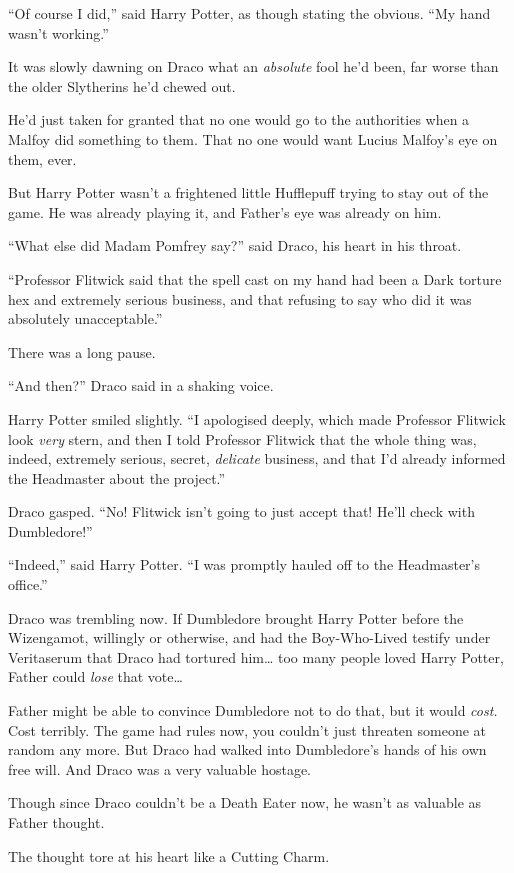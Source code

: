 ``Of course I did,'' said Harry Potter, as though stating the obvious.
``My hand wasn't working.''

It was slowly dawning on Draco what an \emph{absolute} fool he'd been,
far worse than the older Slytherins he'd chewed out.

He'd just taken for granted that no one would go to the authorities when
a Malfoy did something to them. That no one would want Lucius Malfoy's
eye on them, ever.

But Harry Potter wasn't a frightened little Hufflepuff trying to stay
out of the game. He was already playing it, and Father's eye was already
on him.

``What else did Madam Pomfrey say?'' said Draco, his heart in his
throat.

``Professor Flitwick said that the spell cast on my hand had been a Dark
torture hex and extremely serious business, and that refusing to say who
did it was absolutely unacceptable.''

There was a long pause.

``And then?'' Draco said in a shaking voice.

Harry Potter smiled slightly. ``I apologised deeply, which made
Professor Flitwick look \emph{very} stern, and then I told Professor
Flitwick that the whole thing was, indeed, extremely serious, secret,
\emph{delicate} business, and that I'd already informed the Headmaster
about the project.''

Draco gasped. ``No! Flitwick isn't going to just accept that! He'll
check with Dumbledore!''

``Indeed,'' said Harry Potter. ``I was promptly hauled off to the
Headmaster's office.''

Draco was trembling now. If Dumbledore brought Harry Potter before the
Wizengamot, willingly or otherwise, and had the Boy-Who-Lived testify
under Veritaserum that Draco had tortured him\ldots{} too many people
loved Harry Potter, Father could \emph{lose} that vote\ldots{}

Father might be able to convince Dumbledore not to do that, but it would
\emph{cost.} Cost terribly. The game had rules now, you couldn't just
threaten someone at random any more. But Draco had walked into
Dumbledore's hands of his own free will. And Draco was a very valuable
hostage.

Though since Draco couldn't be a Death Eater now, he wasn't as valuable
as Father thought.

The thought tore at his heart like a Cutting Charm.

